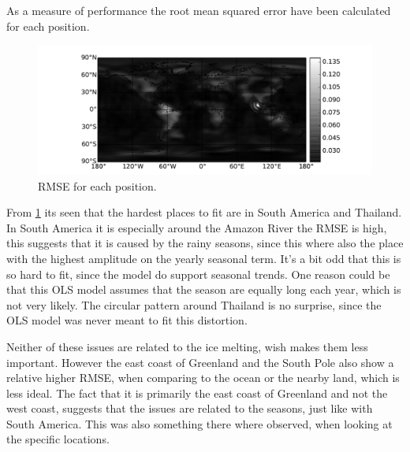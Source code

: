 As a measure of performance the root mean squared error have been calculated for each position.
\begin{figure}[H]
	\centering
	\includegraphics[width=\textwidth]{figures/ols-world-performance-rmse}
	\caption{RMSE for each position.}
	\label{fig:ols-world-performance-rmse}
\end{figure}

From \ref{fig:ols-world-performance-rmse} its seen that the hardest places to fit are in South America and Thailand. In South America it is especially around the Amazon River the RMSE is high, this suggests that it is caused by the rainy seasons, since this where also the place with the highest amplitude on the yearly seasonal term. It's a bit odd that this is so hard to fit, since the model do support seasonal trends. One reason could be that this OLS model assumes that the season are equally long each year, which is not very likely. The circular pattern around Thailand is no surprise, since the OLS model was never meant to fit this distortion.

Neither of these issues are related to the ice melting, wish makes them less important. However the east coast of Greenland and the South Pole also show a relative higher RMSE, when comparing to the ocean or the nearby land, which is less ideal. The fact that it is primarily the east coast of Greenland and not the west coast, suggests that the issues are related to the seasons, just like with South America. This was also something there where observed, when looking at the specific locations.
